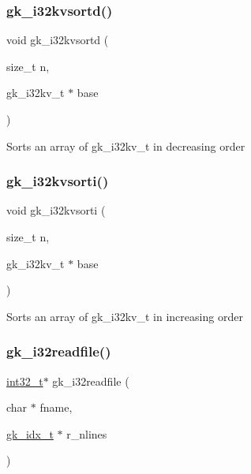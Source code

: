 \subsubsection{\texorpdfstring{gk\+\_\+i32kvsortd()}{gk\_i32kvsortd()}}
{\footnotesize\ttfamily void gk\+\_\+i32kvsortd (\begin{DoxyParamCaption}\item[{size\+\_\+t}]{n,  }\item[{gk\+\_\+i32kv\+\_\+t $\ast$}]{base }\end{DoxyParamCaption})}

Sorts an array of gk\+\_\+i32kv\+\_\+t in decreasing order \mbox{\label{a00077_a688a9ee048d1e7190a680582ed43e771}} 
\subsubsection{\texorpdfstring{gk\+\_\+i32kvsorti()}{gk\_i32kvsorti()}}
{\footnotesize\ttfamily void gk\+\_\+i32kvsorti (\begin{DoxyParamCaption}\item[{size\+\_\+t}]{n,  }\item[{gk\+\_\+i32kv\+\_\+t $\ast$}]{base }\end{DoxyParamCaption})}

Sorts an array of gk\+\_\+i32kv\+\_\+t in increasing order \mbox{\label{a00077_a201c46a9a2bf9c06a917f259d109b7ee}} 
\subsubsection{\texorpdfstring{gk\+\_\+i32readfile()}{gk\_i32readfile()}}
{\footnotesize\ttfamily \hyperlink{a00119_a37994e3b11c72957c6f454c6ec96d43d}{int32\+\_\+t}$\ast$ gk\+\_\+i32readfile (\begin{DoxyParamCaption}\item[{char $\ast$}]{fname,  }\item[{\hyperlink{a00083_a899f9d8c47b1ca0c2fead41097f4bde2}{gk\+\_\+idx\+\_\+t} $\ast$}]{r\+\_\+nlines }\end{DoxyParamCaption})}

